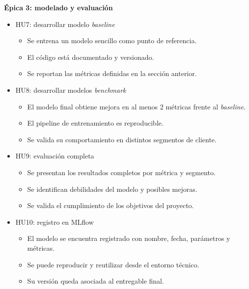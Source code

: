 \documentclass[
11pt, %
]{charter}
\begin{document}
\textbf{\'Epica 3: modelado y evaluación}
\begin{itemize}
  \item HU7: desarrollar modelo \textit{baseline}
  \begin{itemize}
    \item Se entrena un modelo sencillo como punto de referencia.
    \item El código está documentado y versionado.
    \item Se reportan las métricas definidas en la sección anterior.
  \end{itemize}
  \item HU8: desarrollar modelos \textit{benchmark}
  \begin{itemize}
    \item El modelo final obtiene mejora en al menos 2 métricas frente al \textit{baseline}.
    \item El pipeline de entrenamiento es reproducible.
    \item Se valida su comportamiento en distintos segmentos de cliente.
  \end{itemize}
  \item HU9: evaluación completa
  \begin{itemize}
    \item Se presentan los resultados completos por métrica y segmento.
    \item Se identifican debilidades del modelo y posibles mejoras.
    \item Se valida el cumplimiento de los objetivos del proyecto.
  \end{itemize}
  \item HU10: registro en MLflow
  \begin{itemize}
    \item El modelo se encuentra registrado con nombre, fecha, parámetros y métricas.
    \item Se puede reproducir y reutilizar desde el entorno técnico.
    \item Su versión queda asociada al entregable final.
  \end{itemize}
\end{itemize}
\end{document}
